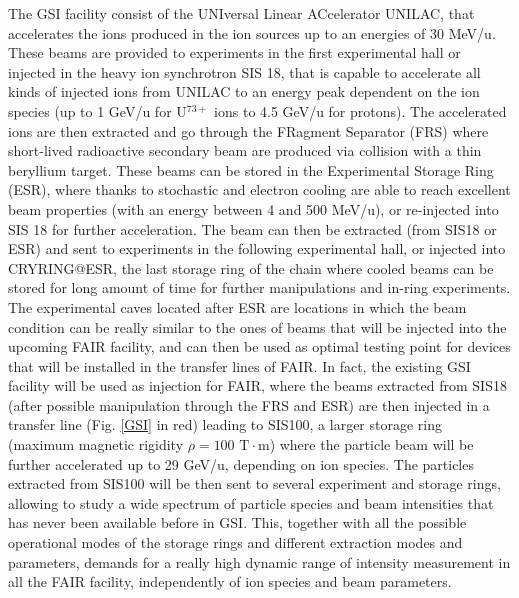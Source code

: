 \documentclass[12pt,a4paper]{report}
\begin{document}
	The GSI facility consist of the UNIversal Linear ACcelerator UNILAC, that accelerates the ions produced in the ion sources up to an energies of 30 MeV/u. These beams are provided to experiments in the first experimental hall or injected in the heavy ion synchrotron SIS 18, that is capable to accelerate all kinds of injected ions from UNILAC to an energy peak dependent on the ion species (up to 1 GeV/u for U$^{73+}$ ions to 4.5 GeV/u for protons). The accelerated ions are then extracted and go through the FRagment Separator (FRS) where short-lived radioactive secondary beam are produced via collision with a thin beryllium target. These beams can be stored in the Experimental Storage Ring (ESR), where thanks to stochastic and electron cooling are able to reach excellent beam properties (with an energy between 4 and 500 MeV/u), or re-injected into SIS 18 for further acceleration. The beam can then be extracted (from SIS18 or ESR) and sent to experiments in the following experimental hall, or injected into CRYRING@ESR, the last storage ring of the chain where cooled beams can be stored for long amount of time for further manipulations and in-ring experiments.\\
	The experimental caves located after ESR are locations in which the beam condition can be really similar to the ones of beams that will be injected into the upcoming FAIR facility, and can then be used as optimal testing point for devices that will be installed in the transfer lines of FAIR. In fact, the existing GSI facility will be used as injection for FAIR, where the beams extracted from SIS18 (after possible manipulation through the FRS and ESR) are then injected in a transfer line (Fig. \ref{GSI} in red) leading to SIS100, a larger storage ring (maximum magnetic rigidity $\rho = 100 \text{ T} \cdot \text{m} $) where the particle beam will be further accelerated up to 29 GeV/u, depending on ion species. The particles extracted from SIS100 will be then sent to several experiment and storage rings, allowing to study a wide spectrum of particle species and beam intensities that has never been available before in GSI. This, together with all the possible operational modes of the storage rings and different extraction modes and parameters, demands for a really high dynamic range of intensity measurement in all the FAIR facility, independently of ion species and beam parameters.
\end{document}
